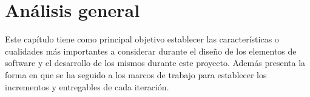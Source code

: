 \chapter{Análisis general}
\label{ch:analisis}

 Este capítulo tiene como principal objetivo establecer las características o cualidades más
 importantes a considerar durante el diseño de los elementos de software y el desarrollo de los
 mismos durante este proyecto. Además presenta la forma en que se ha seguido a los marcos de
 trabajo para establecer los incrementos y entregables de cada iteración.

    


    \clearpage
    

    \clearpage
    


    \clearpage
    

    

    \clearpage
    

